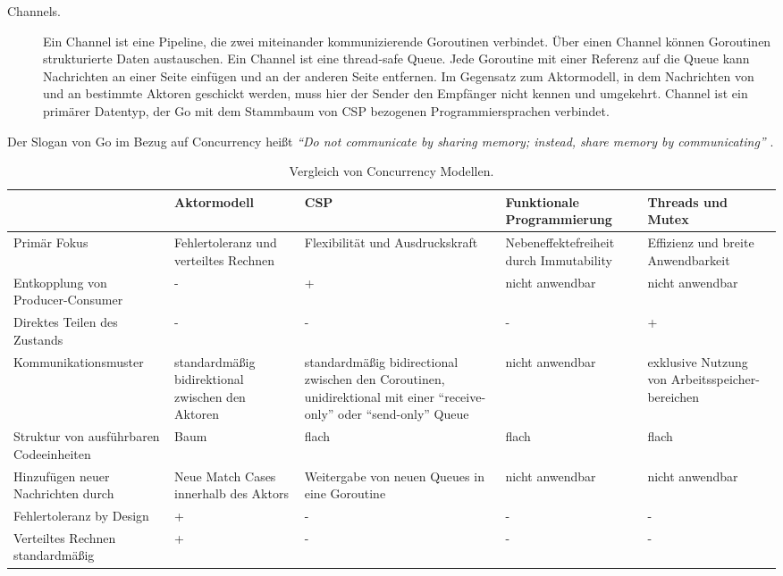 \begin{description}
\begin{description}
		\item[Channels.] Ein Channel ist eine Pipeline, die zwei miteinander kommunizierende Goroutinen verbindet. Über einen Channel können Goroutinen strukturierte Daten austauschen. Ein Channel ist eine thread-safe Queue. Jede Goroutine mit einer Referenz auf die Queue kann Nachrichten an einer Seite einfügen und an der anderen Seite entfernen. Im Gegensatz zum Aktormodell, in dem Nachrichten von und an bestimmte Aktoren geschickt werden, muss hier der Sender den Empfänger nicht kennen und umgekehrt. Channel ist ein primärer Datentyp, der Go mit dem Stammbaum von CSP bezogenen Programmiersprachen verbindet.
	\end{description}

	Der Slogan von Go im Bezug auf Concurrency heißt \textit{“Do not communicate by sharing memory; instead, share memory by communicating”} \cite{Westrup14usingthe}.
	
\end{description}

\begin{table} \centering
	\begin{tabular}{|P{3cm}|P{3cm}|P{3cm}|P{3cm}|P{3cm}|} 
		\hline
		&  \textbf{Aktormodell} & \textbf{CSP} & \textbf{Funktionale Programmierung} & \textbf{Threads und Mutex}\\
		
		\hline
		Primär Fokus & Fehlertoleranz und verteiltes Rechnen & Flexibilität und Ausdruckskraft & Nebeneffektefreiheit durch Immutability & Effizienz und breite Anwendbarkeit\\
		
		\hline
		Entkopplung von Producer-Consumer & - & + & nicht anwendbar & nicht anwendbar\\

		\hline
		Direktes Teilen des Zustands & - & - & - & +\\
		
		\hline
		Kommunikationsmuster & standardmäßig bidirektional zwischen den Aktoren & standardmäßig bidirectional zwischen den Coroutinen, unidirektional mit einer “receive-only” oder “send-only” Queue & nicht anwendbar & exklusive Nutzung von Arbeitsspeicher-bereichen\\
		
		\hline
		Struktur von ausführbaren Codeeinheiten & Baum & flach & flach & flach\\
		
		\hline
		Hinzufügen neuer Nachrichten durch & Neue Match Cases innerhalb des Aktors & Weitergabe von neuen Queues in eine Goroutine & nicht anwendbar & nicht anwendbar\\

		\hline
		Fehlertoleranz by Design & + & - & - & -\\
		
		\hline
		Verteiltes Rechnen standardmäßig & + & - & - & -\\
		
		\hline
	\end{tabular}
	\caption{Vergleich von Concurrency Modellen.}
	\label{tab:vergleichConcurrencyModelle}
\end{table}


